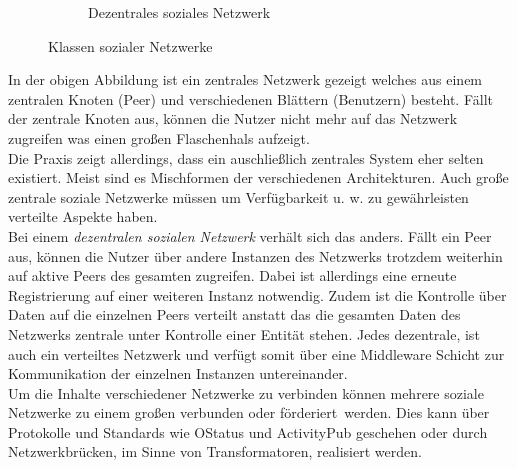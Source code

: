\begin{figure}[h]
\begin{subfigure}[t]{0.4\linewidth}
			\caption{Dezentrales soziales Netzwerk}
			\label{fig:decentral-network}
		\end{subfigure}
		\vspace{4pt}
		\caption{Klassen sozialer Netzwerke}
	\end{figure}
	In der obigen Abbildung ist ein zentrales Netzwerk gezeigt welches aus einem zentralen Knoten (Peer) und verschiedenen Blättern (Benutzern) besteht. Fällt der zentrale Knoten aus, können die Nutzer nicht mehr auf das Netzwerk zugreifen was einen großen Flaschenhals aufzeigt.~\\
	
	Die Praxis zeigt allerdings, dass ein auschließlich zentrales System eher selten existiert. Meist sind es Mischformen der verschiedenen Architekturen. Auch große zentrale soziale Netzwerke müssen um Verfügbarkeit u. w. zu gewährleisten verteilte Aspekte haben.~\\
	
	Bei einem \textit{dezentralen sozialen Netzwerk} verhält sich das anders. Fällt ein Peer aus, können die Nutzer über andere Instanzen des Netzwerks trotzdem weiterhin auf aktive Peers des gesamten zugreifen. Dabei ist allerdings eine erneute Registrierung auf einer weiteren Instanz notwendig. Zudem ist die Kontrolle über Daten auf die einzelnen Peers verteilt anstatt das die gesamten Daten des Netzwerks zentrale unter Kontrolle einer Entität stehen. Jedes dezentrale, ist auch ein verteiltes Netzwerk und verfügt somit über eine Middleware Schicht zur Kommunikation der einzelnen Instanzen untereinander.~\\

	Um die Inhalte verschiedener Netzwerke zu verbinden können mehrere soziale Netzwerke zu einem großen verbunden oder \glqq förderiert\grqq~werden. Dies kann über Protokolle und Standards wie OStatus und ActivityPub geschehen oder durch Netzwerkbrücken, im Sinne von Transformatoren, realisiert werden.
